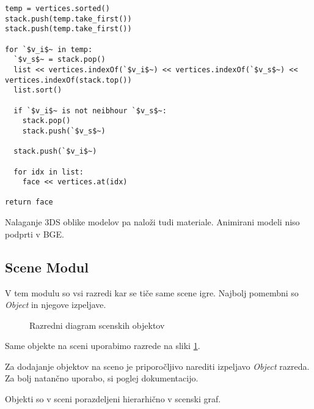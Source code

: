 \documentclass[a4paper]{article}
\begin{document}
\begin{lstlisting}[caption={Algoritm za triangulacijo}]
temp = vertices.sorted()
stack.push(temp.take_first())
stack.push(temp.take_first())

for `$v_i$~ in temp:
  `$v_s$~ = stack.pop()
  list << vertices.indexOf(`$v_i$~) << vertices.indexOf(`$v_s$~) << vertices.indexOf(stack.top())
  list.sort()
  
  if `$v_i$~ is not neibhour `$v_s$~:
    stack.pop()
    stack.push(`$v_s$~)
  
  stack.push(`$v_i$~)
  
  for idx in list:
    face << vertices.at(idx)

return face
\end{lstlisting}

Nalaganje 3DS oblike modelov pa naloži tudi materiale. Animirani modeli niso podprti v BGE.

\subsection{Scene Modul}
V tem modulu so vsi razredi kar se tiče same scene igre. Najbolj pomembni so \emph{Object} in njegove izpeljave.

\begin{figure}
  \centering

  \label{graf:class_scene_object}
  \caption{Razredni diagram scenskih objektov}
\end{figure}
Same objekte na sceni uporabimo razrede na sliki \ref{graf:class_scene_object}.

Za dodajanje objektov na sceno je priporočljivo narediti izpeljavo \emph{Object} razreda. Za bolj natančno uporabo, si poglej dokumentacijo.

Objekti so v sceni porazdeljeni hierarhično v scenski graf.
\end{document}
